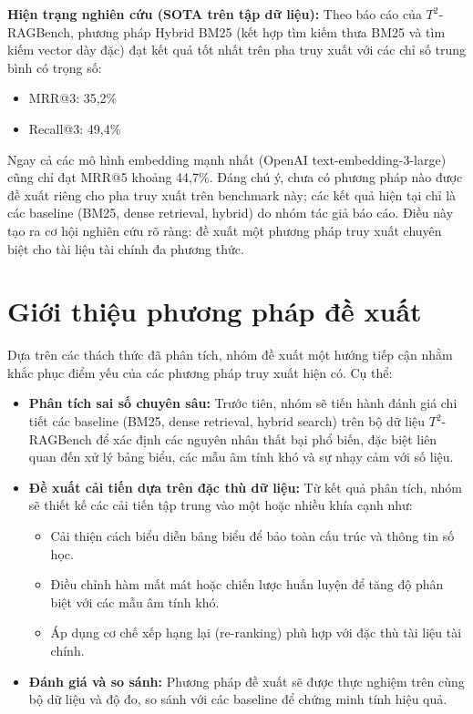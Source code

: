 \documentclass[12pt,a4paper]{article}
\begin{document}
\textbf{Hiện trạng nghiên cứu (SOTA trên tập dữ liệu):}
Theo báo cáo của $T^2$-RAGBench, phương pháp Hybrid BM25 (kết hợp tìm kiếm thưa BM25 và tìm kiếm vector dày đặc) đạt kết quả tốt nhất trên pha truy xuất với các chỉ số trung bình có trọng số:
\begin{itemize}
    \item MRR@3: 35,2\%
    \item Recall@3: 49,4\%
\end{itemize}
Ngay cả các mô hình embedding mạnh nhất (OpenAI text-embedding-3-large) cũng chỉ đạt MRR@5 khoảng 44,7\%. Đáng chú ý, chưa có phương pháp nào được đề xuất riêng cho pha truy xuất trên benchmark này; các kết quả hiện tại chỉ là các baseline (BM25, dense retrieval, hybrid) do nhóm tác giả báo cáo. Điều này tạo ra cơ hội nghiên cứu rõ ràng: đề xuất một phương pháp truy xuất chuyên biệt cho tài liệu tài chính đa phương thức.

\section{Giới thiệu phương pháp đề xuất}

Dựa trên các thách thức đã phân tích, nhóm đề xuất một hướng tiếp cận nhằm khắc phục điểm yếu của các phương pháp truy xuất hiện có. Cụ thể:

\begin{itemize}
    \item \textbf{Phân tích sai số chuyên sâu:} Trước tiên, nhóm sẽ tiến hành đánh giá chi tiết các baseline (BM25, dense retrieval, hybrid search) trên bộ dữ liệu $T^2$-RAGBench để xác định các nguyên nhân thất bại phổ biến, đặc biệt liên quan đến xử lý bảng biểu, các mẫu âm tính khó và sự nhạy cảm với số liệu.
    \item \textbf{Đề xuất cải tiến dựa trên đặc thù dữ liệu:} Từ kết quả phân tích, nhóm sẽ thiết kế các cải tiến tập trung vào một hoặc nhiều khía cạnh như:
    \begin{itemize}
        \item Cải thiện cách biểu diễn bảng biểu để bảo toàn cấu trúc và thông tin số học.
        \item Điều chỉnh hàm mất mát hoặc chiến lược huấn luyện để tăng độ phân biệt với các mẫu âm tính khó.
        \item Áp dụng cơ chế xếp hạng lại (re-ranking) phù hợp với đặc thù tài liệu tài chính.
    \end{itemize}
    \item \textbf{Đánh giá và so sánh:} Phương pháp đề xuất sẽ được thực nghiệm trên cùng bộ dữ liệu và độ đo, so sánh với các baseline để chứng minh tính hiệu quả.
\end{itemize}
\end{document}
